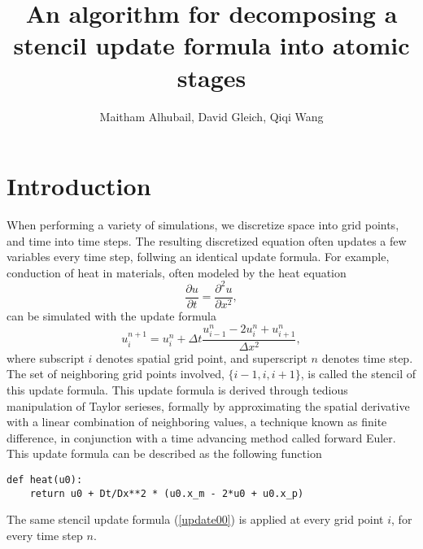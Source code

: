 \documentclass[12pt]{article}
\title{An algorithm for decomposing a stencil update formula into atomic stages}
\author{Maitham Alhubail, David Gleich, Qiqi Wang}
\begin{document}
\maketitle

\section{Introduction}
When performing a variety of simulations, we discretize space into grid points, and time into time steps.  The resulting discretized equation often updates a few variables every time step, follwing an identical update formula.  For example, conduction of heat in materials, often modeled by the heat equation
\begin{equation}
\frac{\partial u}{\partial t} = \frac{\partial^2 u}{\partial x^2},
\end{equation}
can be simulated with the update formula
\begin{equation} \label{update00}
u_i^{n+1} = u_i^n + \Delta t \frac{u_{i-1}^n - 2 u_i^n + u_{i+1}^n}{\Delta x^2},
\end{equation}
where subscript $i$ denotes spatial grid point, and superscript $n$ denotes time step.  The set of neighboring grid points involved, $\{i-1, i, i+1\}$, is called the stencil of this update formula.
This update formula is derived through tedious manipulation of Taylor serieses, formally by approximating the spatial derivative with a linear combination of neighboring values, a technique known as finite difference, in conjunction with a time advancing method called forward Euler.
This update formula can be described as the following function
\begin{lstlisting}
def heat(u0):
    return u0 + Dt/Dx**2 * (u0.x_m - 2*u0 + u0.x_p)
\end{lstlisting}
The same stencil update formula (\ref{update00}) is applied at every grid point $i$, for every time step $n$.
\end{document}
